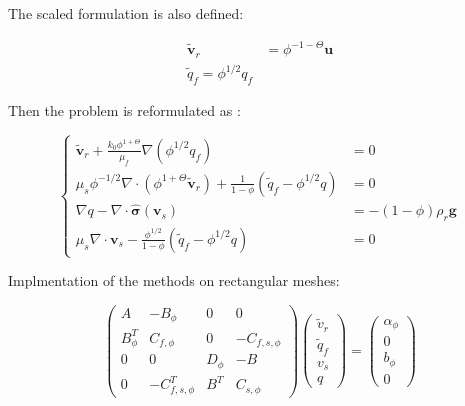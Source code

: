 The scaled formulation is also defined:

\begin{equation*}
		  \begin{aligned}
					 \tilde{\boldsymbol v}_r &= \phi^{-1-\Theta} \boldsymbol u\\
					 \tilde{q}_f = \phi^{1/2}q_f
		  \end{aligned}
\end{equation*}

Then the problem is reformulated as :

\begin{equation*}
					 \left \{
					 \begin{aligned}
								\tilde{\boldsymbol v}_r + \frac{k_0 \phi^{1+\Theta}}{\mu_f}\nabla (\phi^{1/2} q_f) &= 0\\
								\mu_s \phi^{-1/2} \nabla \cdot (\phi^{1+\Theta}\tilde{\boldsymbol v}_r) + \frac{1}{1-\phi}(\tilde{q}_f-\phi^{1/2}q) &=0 \\
								\nabla q - \nabla \cdot \hat{\boldsymbol \sigma}(\boldsymbol v_s) &= -(1-\phi)\rho_r \boldsymbol g\\
								\mu_s \nabla \cdot \boldsymbol v_s - \frac{\phi^{1/2}}{1-\phi}(\tilde{q}_f-\phi^{1/2}q) &=0
					 \end{aligned}
					 \right .
\end{equation*}

Implmentation of the methods on rectangular meshes:

\begin{equation*}
\begin{pmatrix}
		  A & -B_\phi & 0 & 0 \\
		  B^T_\phi & C_{f,\phi} & 0 & -C_{f,s,\phi} \\
		  0 & 0 & D_\phi & -B \\
		  0 & -C^T_{f,s,\phi} & B^T & C_{s,\phi}
\end{pmatrix}  \begin{pmatrix}
		  \tilde{v}_r \\
		  \tilde{q}_f \\
		  v_s \\
		  q
\end{pmatrix} = \begin{pmatrix}
		  \alpha _\phi\\
		  0 \\
		  b_\phi\\
		  0
\end{pmatrix}
\end{equation*}

